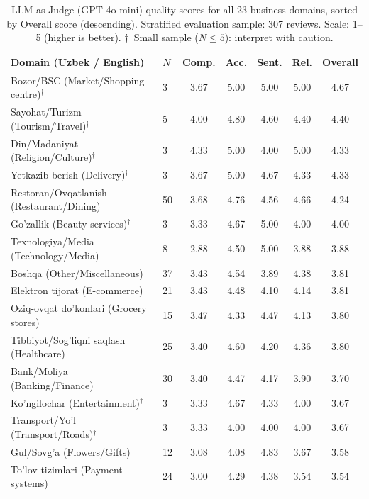 \documentclass[computers,article,submit,pdftex,moreauthors]{Definitions/mdpi}
\begin{document}
\begin{table}[H]
\centering
\caption{LLM-as-Judge (GPT-4o-mini) quality scores for all 23 business domains, sorted by Overall score (descending). Stratified evaluation sample: 307 reviews. Scale: 1--5 (higher is better). $\dagger$~Small sample ($N \leq 5$): interpret with caution.\label{tab:domain_quality_full}}
\setlength{\tabcolsep}{3.5pt}
\small
\begin{tabular}{llccccc}
\toprule
\textbf{Domain (Uzbek / English)} & $N$ & \textbf{Comp.} & \textbf{Acc.} & \textbf{Sent.} & \textbf{Rel.} & \textbf{Overall} \\
\midrule
Bozor/BSC (Market/Shopping centre)$^\dagger$ & 3  & 3.67 & 5.00 & 5.00 & 5.00 & 4.67 \\
Sayohat/Turizm (Tourism/Travel)$^\dagger$   & 5  & 4.00 & 4.80 & 4.60 & 4.40 & 4.40 \\
Din/Madaniyat (Religion/Culture)$^\dagger$   & 3  & 4.33 & 5.00 & 4.00 & 5.00 & 4.33 \\
Yetkazib berish (Delivery)$^\dagger$          & 3  & 3.67 & 5.00 & 4.67 & 4.33 & 4.33 \\
Restoran/Ovqatlanish (Restaurant/Dining)      & 50 & 3.68 & 4.76 & 4.56 & 4.66 & 4.24 \\
Go'zallik (Beauty services)$^\dagger$         & 3  & 3.33 & 4.67 & 5.00 & 4.00 & 4.00 \\
Texnologiya/Media (Technology/Media)          & 8  & 2.88 & 4.50 & 5.00 & 3.88 & 3.88 \\
Boshqa (Other/Miscellaneous)                  & 37 & 3.43 & 4.54 & 3.89 & 4.38 & 3.81 \\
Elektron tijorat (E-commerce)                 & 21 & 3.43 & 4.48 & 4.10 & 4.14 & 3.81 \\
Oziq-ovqat do'konlari (Grocery stores)        & 15 & 3.47 & 4.33 & 4.47 & 4.13 & 3.80 \\
Tibbiyot/Sog'liqni saqlash (Healthcare)       & 25 & 3.40 & 4.60 & 4.20 & 4.36 & 3.80 \\
Bank/Moliya (Banking/Finance)                 & 30 & 3.40 & 4.47 & 4.17 & 3.90 & 3.70 \\
Ko'ngilochar (Entertainment)$^\dagger$        & 3  & 3.33 & 4.67 & 4.33 & 4.00 & 3.67 \\
Transport/Yo'l (Transport/Roads)$^\dagger$    & 3  & 3.33 & 4.00 & 4.00 & 4.00 & 3.67 \\
Gul/Sovg'a (Flowers/Gifts)                    & 12 & 3.08 & 4.08 & 4.83 & 3.67 & 3.58 \\
To'lov tizimlari (Payment systems)            & 24 & 3.00 & 4.29 & 4.38 & 3.54 & 3.54 \\

\end{tabular}
\end{table}
\end{document}
